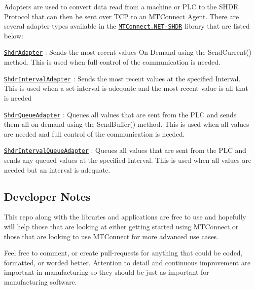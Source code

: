 Adapters are used to convert data read from a machine or P\+LC to the S\+H\+DR Protocol that can then be sent over T\+CP to an M\+T\+Connect Agent. There are several adapter types available in the \href{https://github.com/TrakHound/MTConnect.NET/tree/master/src/MTConnect.NET-SHDR}{\tt M\+T\+Connect.\+N\+ET-\/\+S\+H\+DR} library that are listed below\+:
\begin{DoxyItemize}
\item \href{https://github.com/TrakHound/MTConnect.NET/blob/master/src/MTConnect.NET-SHDR/Adapters/Shdr/ShdrAdapter.cs}{\tt Shdr\+Adapter} \+: Sends the most recent values On-\/\+Demand using the Send\+Current() method. This is used when full control of the communication is needed.
\item \href{https://github.com/TrakHound/MTConnect.NET/blob/master/src/MTConnect.NET-SHDR/Adapters/Shdr/ShdrIntervalAdapter.cs}{\tt Shdr\+Interval\+Adapter} \+: Sends the most recent values at the specified Interval. This is used when a set interval is adequate and the most recent value is all that is needed
\item \href{https://github.com/TrakHound/MTConnect.NET/blob/master/src/MTConnect.NET-SHDR/Adapters/Shdr/ShdrQueueAdapter.cs}{\tt Shdr\+Queue\+Adapter} \+: Queues all values that are sent from the P\+LC and sends them all on demand using the Send\+Buffer() method. This is used when all values are needed and full control of the communication is needed.
\item \href{https://github.com/TrakHound/MTConnect.NET/blob/master/src/MTConnect.NET-SHDR/Adapters/Shdr/ShdrIntervalQueueAdapter.cs}{\tt Shdr\+Interval\+Queue\+Adapter} \+: Queues all values that are sent from the P\+LC and sends any queued values at the specified Interval. This is used when all values are needed but an interval is adequate.
\end{DoxyItemize}

\subsection*{Developer Notes}

This repo along with the libraries and applications are free to use and hopefully will help those that are looking at either getting started using M\+T\+Connect or those that are looking to use M\+T\+Connect for more advanced use cases.

Feel free to comment, or create pull-\/requests for anything that could be coded, formatted, or worded better. Attention to detail and continuous improvement are important in manufacturing so they should be just as important for manufacturing software.

